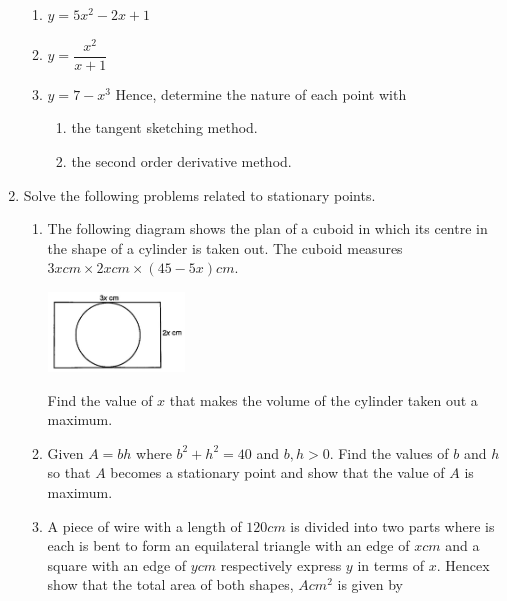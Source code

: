 \documentclass{report}
\begin{document}
\begin{multicols*}{2}
\begin{enumerate}
\begin{enumerate}
                  \item $y = 5x^2 - 2x + 1$
                  \item $y = \dfrac{x^2}{x+1}$
                  \item $y = 7 - x^3$
                        Hence, determine the nature of each point with
                        \begin{enumerate}
                            \item the tangent sketching method.
                            \item the second order derivative method.
                        \end{enumerate}
              \end{enumerate}
        \item Solve the following problems related to stationary points.
              \begin{enumerate}
                  \item The following diagram shows the plan of a cuboid in which its centre in the
                        shape of a cylinder is taken out. The cuboid measures $3x\textit{cm} \times
                            2x\textit{cm} \times (45 - 5x)\textit{cm}$.
                        \begin{center}
                            \includegraphics[width=0.3\textwidth]{./images/q30.jpeg}
                        \end{center}
                        Find the value of $x$ that makes the volume of the cylinder taken out a maximum.
                  \item Given $A = bh$ where $b^2 + h^2 = 40$ and $b, h > 0$. Find the values of $b$
                        and $h$ so that $A$ becomes a stationary point and show that the value of $A$
                        is maximum.
                  \item A piece of wire with a length of $120\textit{cm}$ is divided into two parts
                        where is each is bent to form an equilateral triangle with an edge of
                        $x\textit{cm}$ and a square with an edge of $y\textit{cm}$ respectively express
                        $y$ in terms of $x$. Hencex show that the total area of both shapes,
                        $A\textit{cm}^2$ is given by

\end{enumerate}
\end{enumerate}
\end{multicols*}
\end{document}

